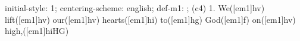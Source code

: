 initial-style: 1;
centering-scheme: english;
def-m1: \grealign;
(c4) 1. We([em1]hv) lift([em1]hv) our([em1]hv) hearts([em1]hi) to([em1]hg) God([em1]f) on([em1]hv) high,([em1]hiHG)
